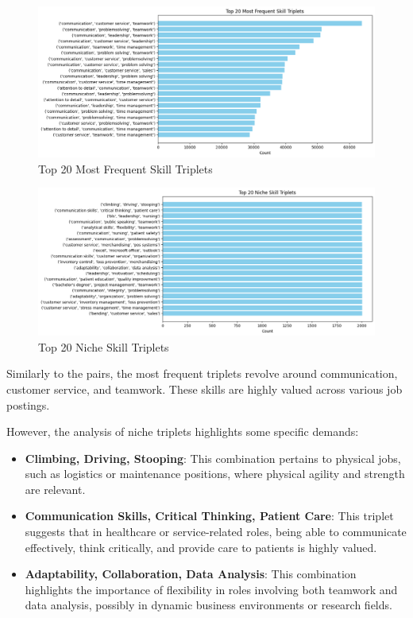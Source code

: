 \documentclass{article}
\begin{document}
\vspace{0.3cm}
\begin{figure}[H]
    \centering
    \includegraphics[width=0.9\linewidth]{download (26).png}
    \caption{Top 20 Most Frequent Skill Triplets}
    \label{fig:skill_triplets_1}
\end{figure}

\vspace{0.3cm}
\begin{figure}[H]
    \centering
    \includegraphics[width=0.9\linewidth]{download (27).png}
    \caption{Top 20 Niche Skill Triplets}
    \label{fig:skill_triplets_2}
\end{figure}

\vspace{0.3cm}
Similarly to the pairs, the most frequent triplets revolve around communication, customer service, and teamwork. These skills are highly valued across various job postings. 

However, the analysis of niche triplets highlights some specific demands:
\begin{itemize}
    \item \textbf{Climbing, Driving, Stooping}: This combination pertains to physical jobs, such as logistics or maintenance positions, where physical agility and strength are relevant.
    
    \item \textbf{Communication Skills, Critical Thinking, Patient Care}: This triplet suggests that in healthcare or service-related roles, being able to communicate effectively, think critically, and provide care to patients is highly valued.
    
    \item \textbf{Adaptability, Collaboration, Data Analysis}: This combination highlights the importance of flexibility in roles involving both teamwork and data analysis, possibly in dynamic business environments or research fields.
\end{itemize}
\end{document}
